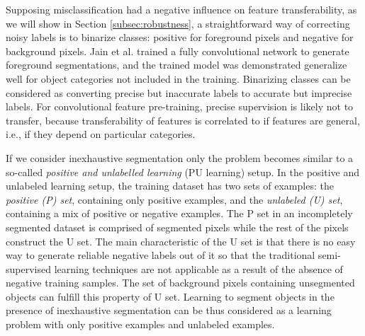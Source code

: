 Supposing misclassification had a negative influence on feature transferability, as we will show in Section \ref{subsec:robustness}, a straightforward way of correcting noisy labels is to binarize classes: positive for foreground pixels and negative for background pixels.
Jain et al.\cite{jain2017pixel} trained a fully convolutional network to generate foreground segmentations, and the trained model was demonstrated generalize well for object categories not included in the training.
Binarizing classes can be considered as converting precise but inaccurate labels to accurate but imprecise labels.
For convolutional feature pre-training, precise supervision is likely not to transfer, because transferability of features is correlated to if features are general, i.e., if they depend on particular categories.


If we consider inexhaustive segmentation only the problem becomes similar to a so-called \textit{positive and unlabelled learning} (PU learning) setup\cite{li2005learning}.
In the positive and unlabeled learning setup, the training dataset has two sets of examples: the \textit{positive (P) set}, containing only positive examples, and the \textit{unlabeled (U) set}, containing a mix of positive or negative examples.
The P set in an incompletely segmented dataset is comprised of segmented pixels while the rest of the pixels construct the U set.
The main characteristic of the U set is that there is no easy way to generate reliable negative labels out of it so that the traditional semi-supervised learning techniques are not applicable as a result of the absence of negative training samples.
The set of background pixels containing unsegmented objects can fulfill this property of U set.
Learning to segment objects in the presence of inexhaustive segmentation can be thus considered as a learning problem with only positive examples and unlabeled examples.


